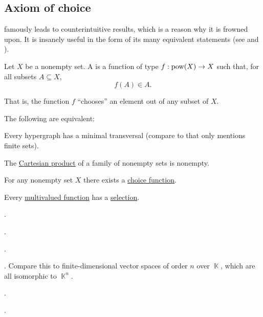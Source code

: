 \subsection{Axiom of choice}\label{subsec:axiom_of_choice}

\begin{remark}\label{rem:aoc}
   famously leads to counterintuitive results, which is a reason why it is frowned upon. It is insanely useful in the form of its many equivalent statements (see  and ).
\end{remark}

\begin{definition}\label{def:choice_function}
  Let \( X \) be a nonempty set. A  is a function of type \( f: \operatorname{pow}(X) \to X \) such that, for all subsets \( A \subseteq X \),
  \begin{equation*}
    f(A) \in A.
  \end{equation*}

  That is, the function \( f \) \enquote{chooses} an element out of any subset of \( X \).
\end{definition}

\begin{theorem}\label{thm:aoc}
  The following are equivalent:

  \begin{ThmEnum}
    Every hypergraph has a minimal transversal (compare to  that only mentions finite sets).

    The \hyperref[def:cartesian_product]{Cartesian product} of a family of nonempty sets is nonempty.

    \medskip

    For any nonempty set \( X \) there exists a \hyperref[def:choice_function]{choice function}.

    \medskip

    Every \hyperref[def:function/multivalued]{multivalued function} has a \hyperref[def:function/selection]{selection}.

     .

     .

     .

     . Compare this to finite-dimensional vector spaces of order \( n \) over \( \BbbK \), which are all isomorphic to \( \BbbK^n \).

     .

     .
  \end{ThmEnum}
\end{theorem}

